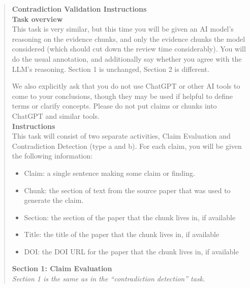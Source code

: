 \begin{quote}
\textbf{Contradiction Validation Instructions }\\
\textbf{Task overview}\\
This task is very similar, but this time you will be given an AI model's reasoning on the evidence chunks, and only the evidence chunks the model considered (which should cut down the review time considerably). You will do the usual annotation, and additionally say whether you agree with the LLM's reasoning. Section 1 is unchanged, Section 2 is different.

We also explicitly ask that you do not use ChatGPT or other AI tools to come to your conclusions, though they may be used if helpful to define terms or clarify concepts. Please do not put claims or chunks into ChatGPT and similar tools.
\\
\textbf{Instructions}\\
This task will consist of two separate activities, Claim Evaluation and Contradiction Detection (type a and b). For each claim, you will be given the following information:
\begin{itemize}
    \item Claim: a single sentence making some claim or finding.
    \item Chunk: the section of text from the source paper that was used to generate the claim.
    \item Section: the section of the paper that the chunk lives in, if available
    \item Title: the title of the paper that the chunk lives in, if available
    \item DOI: the DOI URL for the paper that the chunk lives in, if available
\end{itemize}

\textbf{Section 1: Claim Evaluation}\\
\textit{\*\*Section 1 is the same as in the ``contradiction detection'' task.\*\*}


\end{quote}
